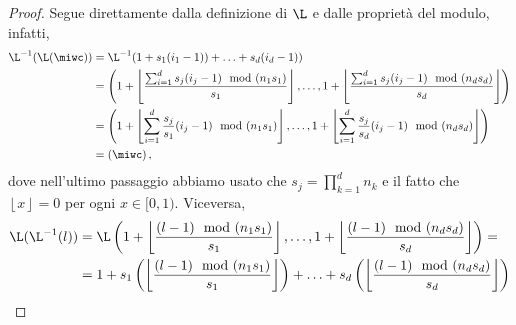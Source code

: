 \begin{proof}
Segue direttamente dalla definizione di $ \L $ e dalle proprietà del modulo, infatti,
\[
\begin{aligned}
  \L^{-1}(\L(\miwc)) &= \L^{-1}(1 + s_1(i_1-1)) + \ldots + s_d(i_d-1)) \\
                     &= \left( 1+ \left\lfloor \frac{\sum_{i=1}^d s_j(i_j-1) \mod(n_1s_1)}{s_1}
                     \right\rfloor, \ldots,   1+ \left\lfloor \frac{\sum_{i=1}^d s_j(i_j-1)
                   \mod(n_ds_d)}{s_d} \right\rfloor \right)\\
                     &= \left( 1+ \left\lfloor \sum_{i=1}^d \frac{s_j}{s_1}(i_j-1) \mod(n_1s_1)
                     \right\rfloor, \ldots,   1+ \left\lfloor \sum_{i=1}^d \frac{s_j}{s_d}(i_j-1)
                   \mod(n_ds_d) \right\rfloor \right)\\
                     &= \left( \miwc \right),
\end{aligned}
\]
dove nell'ultimo passaggio abbiamo usato che $ s_j = \prod_{k=1}^d n_k$ e il fatto che $
\left\lfloor x \right\rfloor = 0 $ per ogni $ x \in [0,1) $.
Viceversa,
\[
\begin{aligned}
  \L(\L^{-1}(l)) &= \L\left(1 + \left\lfloor \frac{ (l-1)\mod(n_1s_1)}{s_1}\right\rfloor, \ldots, 1 +
    \left\lfloor \frac{ (l-1)\mod(n_ds_d)}{s_d} \right\rfloor\right) = \\
                 &=1 + s_1\left(\left\lfloor \frac{(l-1) \mod(n_1s_1)}{s_1} \right\rfloor \right) + \ldots +
                 s_d\left(\left\lfloor \frac{(l-1) \mod(n_ds_d)}{s_d} \right\rfloor\right)
\end{aligned}
\] 
\end{proof}

